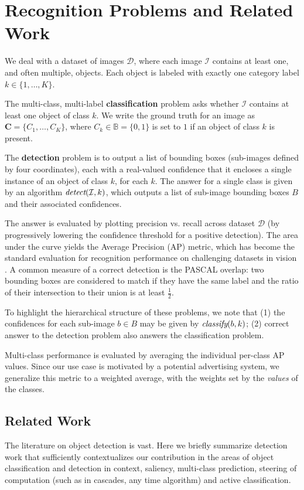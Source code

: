\section{Recognition Problems and Related Work}

We deal with a dataset of images $\mathcal{D}$, where each image $\mathcal{I}$ contains at least one, and often multiple, objects.
Each object is labeled with exactly one category label $k \in \{1, \dots, K\}$.

The multi-class, multi-label \textbf{classification} problem asks whether $\mathcal{I}$ contains at least one object of class $k$.
We write the ground truth for an image as $\mathbf{C}=\{C_1,\dots,C_K\}$, where $C_k \in \mathbb{B} = \{0,1\}$ is set to $1$ if an object of class $k$ is present.

The \textbf{detection} problem is to output a list of bounding boxes (sub-images defined by four coordinates), each with a real-valued confidence that it encloses a single instance of an object of class $k$, for each $k$.
The answer for a single class is given by an algorithm $\emph{detect}(\mathcal{I},k)$, which outputs a list of sub-image bounding boxes $B$ and their associated confidences.

The answer is evaluated by plotting precision vs. recall across dataset $\mathcal{D}$ (by progressively lowering the confidence threshold for a positive detection).
The area under the curve yields the Average Precision (AP) metric, which has become the standard evaluation for recognition performance on challenging datasets in vision \cite{pascal-voc-2010}.
A common measure of a correct detection is the PASCAL overlap: two bounding boxes are considered to match if they have the same label and the ratio of their intersection to their union is at least $\frac{1}{2}$.

To highlight the hierarchical structure of these problems, we note that (1) the confidences for each sub-image $b \in B$ may be given by $\emph{classify}(b,k)$; (2) correct answer to the detection problem also answers the classification problem.

Multi-class performance is evaluated by averaging the individual per-class AP values.
Since our use case is motivated by a potential advertising system, we generalize this metric to a weighted average, with the weights set by the \emph{values} of the classes.

\subsection{Related Work}
The literature on object detection is vast.
Here we briefly summarize detection work that sufficiently contextualizes our contribution in the areas of object classification and detection in context, saliency, multi-class prediction, steering of computation (such as in cascades, any time algorithm) and active classification.

